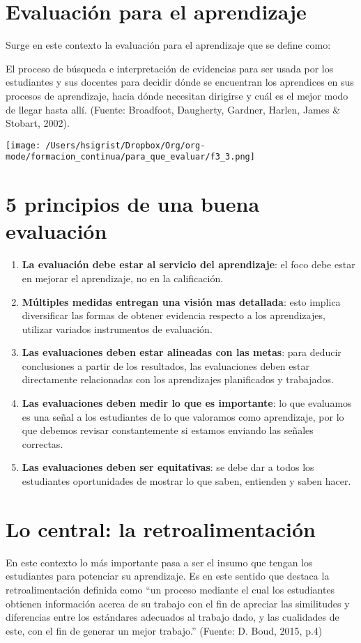 \documentclass[12pt,letterpaper,article,x11names]{memoir}
\begin{document}
\section{Evaluación para el aprendizaje}
\label{sec:orgb2d7d27}

Surge en este contexto la evaluación para el aprendizaje que se define como:

\guillemotleft{}El proceso de búsqueda e interpretación de evidencias para ser usada por los estudiantes y sus docentes para decidir dónde se encuentran los aprendices en sus procesos de aprendizaje, hacia dónde necesitan dirigirse y cuál es el mejor modo de llegar hasta allí.\guillemotright{} (Fuente: Broadfoot, Daugherty, Gardner, Harlen, James \& Stobart, 2002).

\begin{center}
\texttt{[image: /Users/hsigrist/Dropbox/Org/org-mode/formacion\_continua/para\_que\_evaluar/f3\_3.png]}
\end{center}
\section{5 principios de una buena evaluación}
\label{sec:org9c3ebbc}

\begin{enumerate}
\item \textbf{La evaluación debe estar al servicio del aprendizaje}: el foco debe estar en mejorar el aprendizaje, no en la calificación.
\item \textbf{Múltiples medidas entregan una visión mas detallada}: esto implica diversificar las formas de obtener evidencia respecto a los aprendizajes, utilizar variados instrumentos de evaluación.
\item \textbf{Las evaluaciones deben estar alineadas con las metas}: para deducir conclusiones a partir de los resultados, las evaluaciones deben estar directamente relacionadas con los aprendizajes planificados y trabajados.
\item \textbf{Las evaluaciones deben medir lo que es importante}: lo que evaluamos es una señal a los estudiantes de lo que valoramos como aprendizaje, por lo que debemos revisar constantemente si estamos enviando las señales correctas.
\item \textbf{Las evaluaciones deben ser equitativas}: se debe dar a todos los estudiantes oportunidades de mostrar lo que saben, entienden y saben hacer.
\end{enumerate}
\section{Lo central: la retroalimentación}
\label{sec:org42a4d6e}
En este contexto lo más importante pasa a ser el insumo que tengan los estudiantes para potenciar su aprendizaje. Es en este sentido que destaca la retroalimentación definida como “un proceso mediante el cual los estudiantes obtienen información acerca de su trabajo con el fin de apreciar las similitudes y diferencias entre los estándares adecuados al trabajo dado, y las cualidades de este, con el fin de generar un mejor trabajo.” (Fuente: D. Boud, 2015, p.4)
\end{document}
